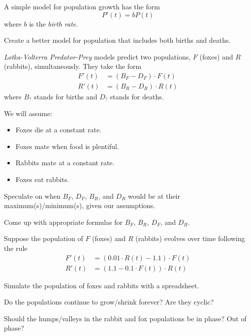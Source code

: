 \documentclass{workbook}
\begin{document}
%
%


\begin{slide}
	\question
	A simple model for population growth has the form
	\[
		P'(t) = bP(t)
	\]
	where $b$ is the \emph{birth rate}.

	\begin{parts}
		\item Create a better model for population that includes both births and deaths.
	\end{parts}
\end{slide}

\begin{slide}
	\question
	\emph{Lotka-Volterra Predator-Prey} models predict two populations, $F$ (foxes) and $R$ (rabbits), simultaneously. They take the form
	\begin{align*}
		F'(t) &= (B_F - D_F)\cdot F(t)\\
		R'(t) &= (B_R - D_R)\cdot R(t)
	\end{align*}
	where $B_{?}$ stands for births and $D_{?}$ stands for deaths.

	We will assume:
	\vspace{-.3cm}
	\begin{itemize}
		\item Foxes die at a constant rate.
		\vspace{-.1cm}
		\item Foxes mate when food is plentiful.
		\vspace{-.1cm}
		\item Rabbits mate at a constant rate.
		\vspace{-.1cm}
		\item Foxes eat rabbits.
	\end{itemize}

	\bigskip
	\begin{parts}
		\item Speculate on when $B_F$, $D_F$, $B_R$, and $D_R$ would be at their maximum(s)/minimum(s), given our assumptions.
		\item Come up with appropriate formulas for $B_F$, $B_R$, $D_F$, and $D_R$.
	\end{parts}
	\bigskip
	\bigskip
	\bigskip
	\bigskip
	\bigskip
	\bigskip
	\phantom{x}
\end{slide}

\begin{slide}
	\question
	Suppose the population of $F$ (foxes) and $R$ (rabbits) evolves over time following the rule
	\begin{align*}
		F'(t) &= (0.01\cdot R(t) - 1.1)\cdot F(t)\\
		R'(t) &= (1.1 - 0.1\cdot F(t))\cdot R(t)
	\end{align*}

	\begin{parts}
		\item Simulate the population of foxes and rabbits with a spreadsheet.
		\item Do the populations continue to grow/shrink forever? Are they cyclic?
		\item Should the humps/valleys in the rabbit and fox populations be in phase? Out of phase?
	\end{parts}
\end{slide}
\end{document}
